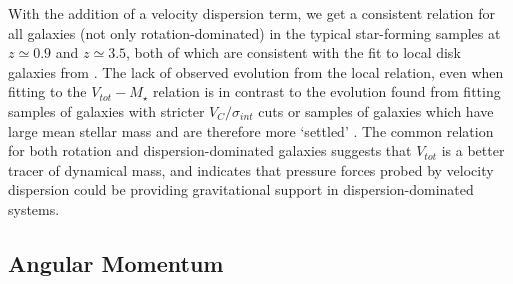 \documentclass[fleqn,usenatbib]{mnras}
\begin{document}
With the addition of a velocity dispersion term, we get a consistent relation for all galaxies (not only rotation-dominated) in the typical star-forming samples at $z\simeq0.9$ and $z\simeq3.5$, both of which are consistent with the fit to local disk galaxies from \cite{Reyes2011}.
The lack of observed evolution from the local relation, even when fitting to the $V_{tot}-M_{\star}$ relation is in contrast to the evolution found from fitting samples of galaxies with stricter $V_{C}/\sigma_{int}$ cuts \citep{Cresci2009,Tiley2016,Straatman2017} or samples of galaxies which have large mean stellar mass and are therefore more `settled' \citep{Ubler2017}.
The common relation for both rotation and dispersion-dominated galaxies suggests that $V_{tot}$ is a better tracer of dynamical mass, and indicates that pressure forces probed by velocity dispersion could be providing gravitational support in dispersion-dominated systems. 

\subsection{Angular Momentum}\label{subsec:ang_mom}
\end{document}
